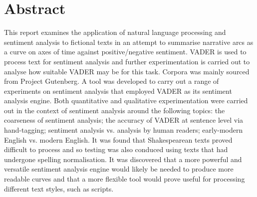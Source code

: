 \documentclass{article}
\begin{document}
\section*{Abstract}
    This report examines the application of natural language processing and sentiment analysis to fictional texts in an attempt to summarise narrative arcs as a curve on axes of time against positive/negative sentiment. VADER is used to process text for sentiment analysis and further experimentation is carried out to analyse how suitable VADER may be for this task. Corpora was mainly sourced from Project Gutenberg. A tool was developed to carry out a range of experiments on sentiment analysis that employed VADER as its sentiment analysis engine. Both quantitative and qualitative experimentation were carried out in the context of sentiment analysis around the following topics: the coarseness of sentiment analysis; the accuracy of VADER at sentence level via hand-tagging; sentiment analysis vs. analysis by human readers; early-modern English vs. modern English. It was found that Shakespearean texts proved difficult to process and so testing was also conduced using texts that had undergone spelling normalisation. It was discovered that a more powerful and versatile sentiment analysis engine would likely be needed to produce more readable curves and that a more flexible tool would prove useful for processing different text styles, such as scripts.
    \newline
    \newline
\end{document}
